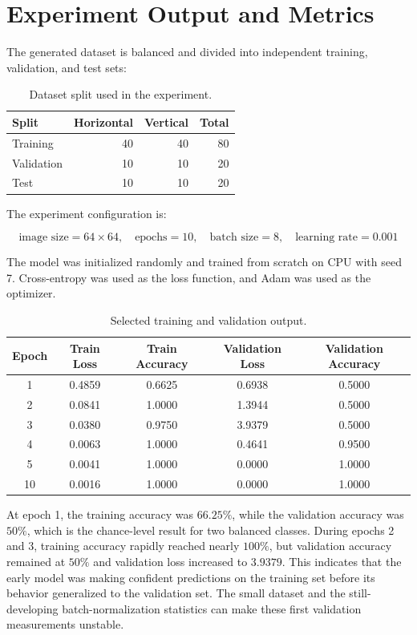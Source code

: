 \documentclass[12pt,a4paper]{article}
\begin{document}
\section{Experiment Output and Metrics}

The generated dataset is balanced and divided into independent training, validation, and test sets:

\begin{table}[H]
\centering
\begin{tabular}{lrrr}
\toprule
Split & Horizontal & Vertical & Total \\
\midrule
Training & 40 & 40 & 80 \\
Validation & 10 & 10 & 20 \\
Test & 10 & 10 & 20 \\
\bottomrule
\end{tabular}
\caption{Dataset split used in the experiment.}
\end{table}

The experiment configuration is:

\[
\text{image size} = 64 \times 64,\quad
\text{epochs} = 10,\quad
\text{batch size} = 8,\quad
\text{learning rate} = 0.001
\]

The model was initialized randomly and trained from scratch on CPU with seed 7.
Cross-entropy was used as the loss function, and Adam was used as the optimizer.

\begin{table}[H]
\centering
\begin{tabular}{ccccc}
\toprule
Epoch & Train Loss & Train Accuracy & Validation Loss & Validation Accuracy \\
\midrule
1 & 0.4859 & 0.6625 & 0.6938 & 0.5000 \\
2 & 0.0841 & 1.0000 & 1.3944 & 0.5000 \\
3 & 0.0380 & 0.9750 & 3.9379 & 0.5000 \\
4 & 0.0063 & 1.0000 & 0.4641 & 0.9500 \\
5 & 0.0041 & 1.0000 & 0.0000 & 1.0000 \\
10 & 0.0016 & 1.0000 & 0.0000 & 1.0000 \\
\bottomrule
\end{tabular}
\caption{Selected training and validation output.}
\end{table}

At epoch 1, the training accuracy was \(66.25\%\), while the validation accuracy was \(50\%\), which is the chance-level result for two balanced classes.
During epochs 2 and 3, training accuracy rapidly reached nearly \(100\%\), but validation accuracy remained at \(50\%\) and validation loss increased to \(3.9379\).
This indicates that the early model was making confident predictions on the training set before its behavior generalized to the validation set.
The small dataset and the still-developing batch-normalization statistics can make these first validation measurements unstable.
\end{document}
